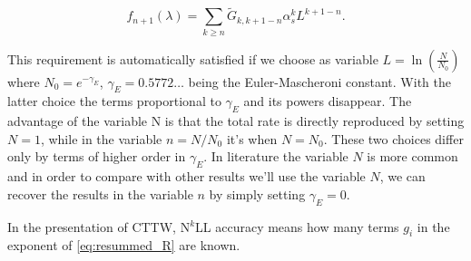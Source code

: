 \documentclass[../Tesi_Jiahao_Miao_986136.tex]{subfiles}
\begin{document}
\begin{equation}
    f_{n+1}(\lambda) = \sum_{k \ge n} \tilde{G}_{k,k+1-n} \alpha_s^k L^{k+1-n}.
\end{equation}

This requirement is automatically satisfied if we choose as variable $L = \ln(\frac{N}{N_0})$ where $N_0 = e^{-\gamma_E}$, $\gamma_E = 0.5772 \dots $ being the Euler-Mascheroni constant.
With the latter choice the terms proportional to $\gamma_E$ and its powers disappear. The advantage of the variable N is that the total rate is directly reproduced by setting $N=1$, while
in the variable $n=N/N_0$ it's when $N=N_0$. These two choices differ only by terms of higher order in $\gamma_E$.
In literature the variable $N$ is more common and in order to compare with other results we'll use the variable $N$, we can recover the results in the variable $n$ by simply setting $\gamma_E = 0$.

In the presentation of CTTW, N$^k$LL accuracy means how many terms $g_i$ in the exponent of \cref{eq:resummed_R} are known.
\end{document}
